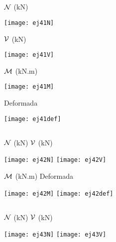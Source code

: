 \subsection{}

${\mathcal N}$ (kN)
\begin{center}
	\texttt{[image: ej41N]}
\end{center}


${\mathcal V}$ (kN)
\begin{center}
	\texttt{[image: ej41V]}
\end{center}

${\mathcal M}$ (kN.m)
\begin{center}
	\texttt{[image: ej41M]}
\end{center}


Deformada
\begin{center}
	\texttt{[image: ej41def]}
\end{center}


\subsection{}

\qquad \qquad
${\mathcal N}$ (kN) \hspace{0.5\textwidth} ${\mathcal V}$ (kN)
\begin{center}
	\texttt{[image: ej42N]}
	\texttt{[image: ej42V]}
\end{center}

\qquad \qquad
${\mathcal M}$ (kN.m)  \hspace{0.5\textwidth} Deformada
\begin{center}
	\texttt{[image: ej42M]}
	\texttt{[image: ej42def]}
\end{center}


\subsection{}

${\mathcal N}$ (kN) \hspace{0.4\textwidth} ${\mathcal V}$ (kN)
\begin{center}
	\texttt{[image: ej43N]}
	\texttt{[image: ej43V]}
\end{center}

